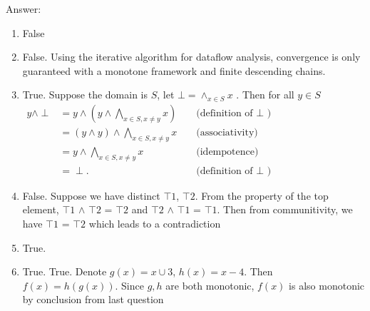\begin{problem}
\item Answer:
\begin{enumerate}
	\item {\color{red}False}
	\item {\color{red}False. Using the iterative algorithm for dataflow analysis, convergence is only guaranteed with a monotone framework and finite descending chains.}
	\item {\color{red}True.  Suppose the domain is $S$, let $\bot = \wedge_{x\in S}x$ . Then for all $y \in S$\\ $\begin{aligned} y \wedge \perp & =y \wedge\left(y \wedge \bigwedge_{x \in S, x \neq y} x\right) & & \text { (definition of } \perp \text { ) } \\ & =(y \wedge y) \wedge \bigwedge_{x \in S, x \neq y} x & & \text { (associativity) } \\ & =y \wedge \bigwedge_{x \in S, x \neq y} x & & \text { (idempotence) } \\ & =\perp . & & \text { (definition of } \perp \text { ) }\end{aligned}$}
	\item {\color{red}False. Suppose we have distinct $\top 1$, $\top 2$. From the property of the top element,
	      $\top 1$ $\wedge$ $\top 2$ = $\top 2$ and $\top 2$ $\wedge$ $\top 1$ = $\top 1$. Then from communitivity, we have $\top 1$ = $\top 2$ which
	      leads to a contradiction}
	\item {\color{red}True. }
	\item {\color{red}True. True. Denote $g(x) = x\cup {3}$, $h(x) = x - {4}$. Then $f(x) = h(g(x))$. Since $g, h$ are both
	      monotonic, $f(x)$ is also monotonic by conclusion from last question}
\end{enumerate}

\end{problem}


